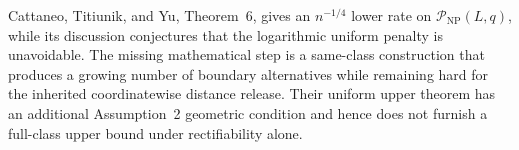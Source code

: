 Cattaneo, Titiunik, and Yu, Theorem~6, gives an \(n^{-1/4}\) lower rate on \(\mathcal P_{\mathrm{NP}}(L,q)\), while its discussion conjectures that the logarithmic uniform penalty is unavoidable.  The missing mathematical step is a same-class construction that produces a growing number of boundary alternatives while remaining hard for the inherited coordinatewise distance release.  Their uniform upper theorem has an additional Assumption~2 geometric condition and hence does not furnish a full-class upper bound under rectifiability alone.